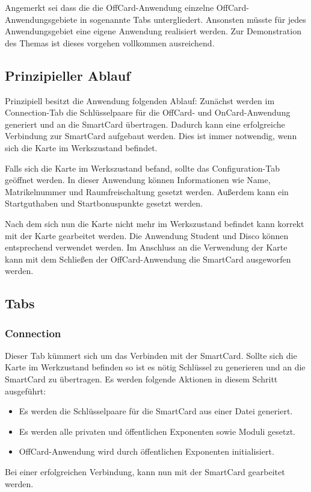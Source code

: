 Angemerkt sei dass die die OffCard-Anwendung einzelne OffCard-Anwendungsgebiete in sogenannte Tabs untergliedert.
Ansonsten müsste für jedes Anwendungsgebiet eine eigene Anwendung realisiert werden.
Zur Demonstration des Themas ist dieses vorgehen vollkommen ausreichend.

\subsection{Prinzipieller Ablauf}
Prinzipiell besitzt die Anwendung folgenden Ablauf:
Zunächst werden im Connection-Tab die Schlüsselpaare für die OffCard- und OnCard-Anwendung generiert und an die SmartCard übertragen.
Dadurch kann eine erfolgreiche Verbindung zur SmartCard aufgebaut werden.
Dies ist immer notwendig, wenn sich die Karte im Werkszustand befindet.

Falls sich die Karte im Werkszustand befand, sollte das Configuration-Tab geöffnet werden.
In dieser Anwendung können Informationen wie Name, Matrikelnummer und Raumfreischaltung gesetzt werden.
Außerdem kann ein Startguthaben und Startbonuspunkte gesetzt werden.

Nach dem sich nun die Karte nicht mehr im Werkszustand befindet kann korrekt mit der Karte gearbeitet werden.
Die Anwendung Student und Disco können entsprechend verwendet werden. 
Im Anschluss an die Verwendung der Karte kann mit dem Schließen der OffCard-Anwendung die SmartCard ausgeworfen werden.
\subsection{Tabs}
\subsubsection{Connection}
Dieser Tab kümmert sich um das Verbinden mit der SmartCard.
Sollte sich die Karte im Werkzustand befinden so ist es nötig Schlüssel zu generieren und an die SmartCard zu übertragen.
Es werden folgende Aktionen in diesem Schritt ausgeführt:
\begin{itemize}
\item Es werden die Schlüsselpaare für die SmartCard aus einer Datei generiert.
\item Es werden alle privaten und öffentlichen Exponenten sowie Moduli gesetzt.
\item OffCard-Anwendung wird durch öffentlichen Exponenten initialisiert.
\end{itemize}

Bei einer erfolgreichen Verbindung, kann nun mit der SmartCard gearbeitet werden.

